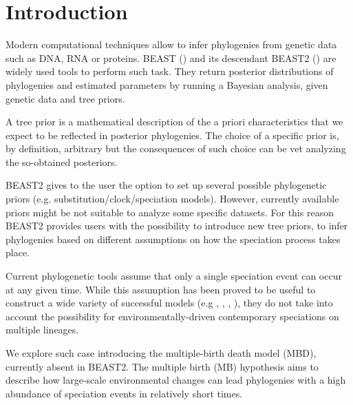 \section{Introduction}

Modern computational techniques allow to infer phylogenies from genetic data 
such as DNA, RNA or proteins. BEAST (\cite{beast}) and its descendant 
BEAST2 (\cite{beast2}) are widely used tools to perform such task. They 
return posterior distributions of phylogenies 
and estimated parameters by running a Bayesian analysis, 
given genetic data and tree priors. 

A tree prior is a mathematical description 
of the a priori characteristics 
that we expect to be reflected in posterior phylogenies. 
The choice of a specific prior is, by definition, 
arbitrary but the consequences of such choice 
can be vet analyzing the so-obtained posteriors.

BEAST2 gives to the user the option to set up 
several possible phylogenetic 
priors (e.g. substitution/clock/speciation models). 
However, currently available priors 
might be not suitable to analyze some specific datasets.
For this reason BEAST2 provides users with the possibility 
to introduce new tree priors, 
to infer phylogenies based on different assumptions 
on how the speciation process takes place.

Current phylogenetic tools assume that 
only a single speciation event can occur at any given time.
While this assumption has been proved to be useful 
to construct a wide variety of successful 
models (e.g \cite{Maddison2007biSSE}, \cite{Valente2015}, 
\cite{etienne2012diversity}, \cite{etienne2014estimating}), 
they do not take into account the possibility 
for environmentally-driven contemporary speciations on multiple lineages.

We explore such case introducing the multiple-birth death model (MBD), 
currently absent in BEAST2. 
The multiple birth (MB) hypothesis aims to describe how large-scale environmental changes can lead phylogenies with a high abundance of speciation events in relatively short times.

\iffalse
\giovanni{This might be good for the abstract}
The (constant-rate) birth-death (BD) model embodies the common assumption 
that only a single speciation event can occur at any given time. 
The multiple-birth-death (MBD) model relaxes this assumption allowing, 
in addition to standard BD events, 
also events in which large-scale environmental changes lead 
to speciation bursts.
\fi

